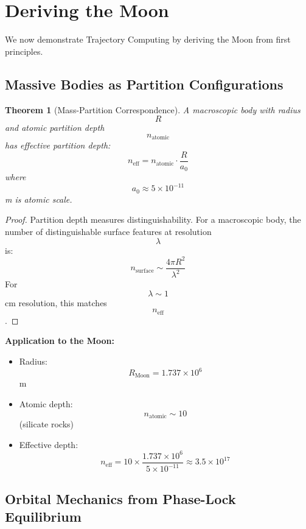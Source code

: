 \documentclass[11pt,twocolumn,a4paper]{article}
\newtheorem{theorem}{Theorem}[section]
\theoremstyle{definition}
\theoremstyle{remark}
\begin{document}
\section{Deriving the Moon}
\label{sec:lunar}

We now demonstrate Trajectory Computing by deriving the Moon from first principles.

\subsection{Massive Bodies as Partition Configurations}

\begin{theorem}[Mass-Partition Correspondence]
\label{thm:mass}
A macroscopic body with radius $$R$$ and atomic partition depth $$n_{\text{atomic}}$$ has effective partition depth:
\begin{equation}
n_{\text{eff}} = n_{\text{atomic}} \cdot \frac{R}{a_0}
\end{equation}
where $$a_0 \approx 5 \times 10^{-11}$$ m is atomic scale.
\end{theorem}

\begin{proof}
Partition depth measures distinguishability. For a macroscopic body, the number of distinguishable surface features at resolution $$\lambda$$ is:
\begin{equation}
n_{\text{surface}} \sim \frac{4\pi R^2}{\lambda^2}
\end{equation}
For $$\lambda \sim 1$$ cm resolution, this matches $$n_{\text{eff}}$$.
\end{proof}

\textbf{Application to the Moon:}
\begin{itemize}
    \item Radius: $$R_{\text{Moon}} = 1.737 \times 10^6$$ m
    \item Atomic depth: $$n_{\text{atomic}} \sim 10$$ (silicate rocks)
    \item Effective depth: $$n_{\text{eff}} = 10 \times \frac{1.737 \times 10^6}{5 \times 10^{-11}} \approx 3.5 \times 10^{17}$$
\end{itemize}

\subsection{Orbital Mechanics from Phase-Lock Equilibrium}
\end{document}
